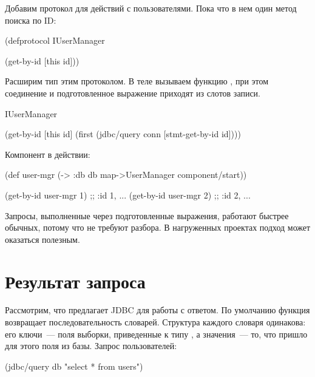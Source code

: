 Добавим протокол для действий с пользователями. Пока что в нем один метод поиска по ID:

\begin{english}
  \begin{clojure}
(defprotocol IUserManager

  (get-by-id [this id]))
  \end{clojure}
\end{english}

Расширим тип  этим протоколом. В теле  вызываем функцию , при этом соединение и подготовленное выражение приходят из слотов записи.

\begin{english}
  \begin{clojure}
IUserManager

(get-by-id [this id]
  (first
    (jdbc/query conn [stmt-get-by-id id])))
  \end{clojure}
\end{english}

Компонент в действии:

\begin{english}
  \begin{clojure}
(def user-mgr
  (-> {:db db}
      map->UserManager
      component/start))

(get-by-id user-mgr 1) ;; {:id 1, ...}
(get-by-id user-mgr 2) ;; {:id 2, ...}
  \end{clojure}
\end{english}

Запросы, выполненные через подготовленные выражения, работают быстрее обычных, потому что не требуют разбора. В нагруженных проектах подход может оказаться полезным.

\section{Результат запроса}

Рассмотрим, что предлагает JDBC для работы с ответом. По умолчанию функция  возвращает последовательность словарей. Структура каждого словаря одинакова: его ключи~--- поля выборки, приведенные к типу , а значения~--- то, что пришло для этого поля из базы. Запрос пользователей:

\begin{english}
  \begin{clojure}
(jdbc/query db "select * from users")
  \end{clojure}
\end{english}

